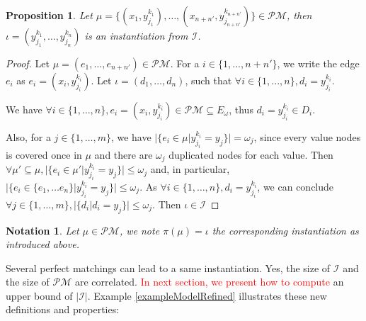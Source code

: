 \documentclass[jair,twoside,11pt,theapa]{article}
\newtheorem{proposition}[theorem]{Proposition}
\newtheorem*{notation}{Notation}
\newcommand{\major}[1]{\textcolor{red}{#1}}
\begin{document}
 \begin{proposition}
 	Let $\mu = \lbrace (x_1, y_{j_1}^{k_1}), \ldots, (x_{n+n'}, y_{j_{n+n'}}^{k_{n+n'}}) \rbrace \in \mathcal{PM}$, then $\iota = (y_{j_1}^{k_1}, \ldots, y_{j_n}^{k_n})$ is an instantiation from $\mathcal{I}$.
 \end{proposition}
 
\begin{proof}
	Let $\mu = (e_1, \ldots, e_{n+n'}) \in \mathcal{PM}$. For a $i \in \lbrace 1,...,n+n' \rbrace$, we write the edge  $e_i$ as $e_i=(x_i, y_{j_i}^{k_i})$. Let $\iota = (d_1, \ldots, d_n)$, such that $\forall i \in \lbrace 1,...,n\rbrace, d_i = y_{j_i}^{k_i}$.
	
	We have $\forall i \in \lbrace 1, \ldots, n \rbrace,  e_i=(x_i, y_{j_i}^{k_i}) \in \mathcal{PM} \subseteq E_{\omega}$, thus $d_i = y_{j_i}^{k_i} \in D_i$.
	
	Also, for a $j \in \lbrace 1, \ldots, m \rbrace$, we have $| \lbrace e_i \in \mu | y_{j_i}^{k_i} = y_j \rbrace| = \omega_j$, since every value nodes is covered once in $\mu$ and there are $\omega_j$ duplicated nodes for each value. Then $\forall \mu' \subseteq \mu, |\lbrace e_i \in \mu' | y_{j_i}^{k_i} = y_j \rbrace| \leq \omega_j$ and, in particular, $|\lbrace e_i \in \lbrace e_1, \ldots e_n \rbrace | y_{j_i}^{k_i} = y_j \rbrace| \leq \omega_j$. As $\forall i \in \lbrace 1, \ldots, n\rbrace, d_i = y_{j_i}^{k_i}$, we can conclude $ \forall j \in \lbrace 1, \ldots, m \rbrace, |\lbrace d_i | d_i=y_j\rbrace| \leq \omega_j$. Then $\iota \in \mathcal{I}$
\end{proof} 

\begin{notation}
	Let $\mu \in \mathcal{PM}$, we note $\pi(\mu) = \iota$ the corresponding instantiation as introduced above. %
\end{notation}

Several perfect matchings can lead to a same instantiation. Yes, the size of $\mathcal{I}$ and the size of $\mathcal{PM}$ are correlated. \major{In next section, we present how to compute} an upper bound of $|\mathcal{I}|$.
%
Example \ref{exampleModelRefined} illustrates these new definitions and properties:
\end{document}
